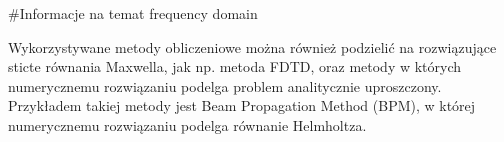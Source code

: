 #Informacje na temat frequency domain

Wykorzystywane metody obliczeniowe można również podzielić na rozwiązujące sticte równania Maxwella, jak np. metoda FDTD, oraz metody w których numerycznemu rozwiązaniu podelga problem analitycznie uproszczony. Przykładem takiej metody jest Beam Propagation Method (BPM), w której numerycznemu rozwiązaniu podelga równanie Helmholtza.






 
